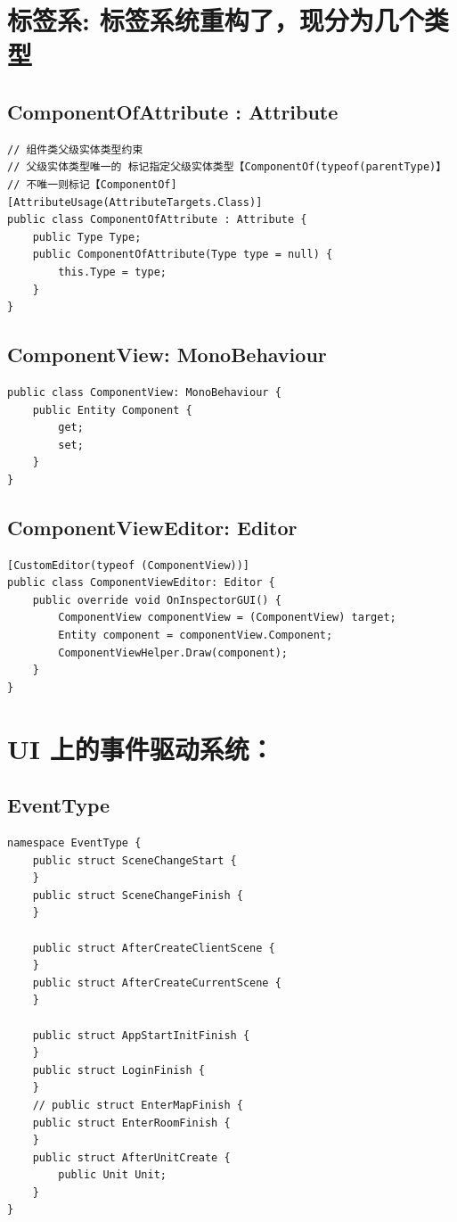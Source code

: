 \documentclass[9pt, b5paper]{article}
\begin{document}
\section{标签系: 标签系统重构了，现分为几个类型}
\label{sec-4}
\subsection{ComponentOfAttribute : Attribute}
\label{sec-4-1}
\begin{verbatim}
// 组件类父级实体类型约束
// 父级实体类型唯一的 标记指定父级实体类型【ComponentOf(typeof(parentType)】
// 不唯一则标记【ComponentOf]
[AttributeUsage(AttributeTargets.Class)]
public class ComponentOfAttribute : Attribute {
    public Type Type;
    public ComponentOfAttribute(Type type = null) {
        this.Type = type;
    }
}
\end{verbatim}
\subsection{ComponentView: MonoBehaviour}
\label{sec-4-2}
\begin{verbatim}
public class ComponentView: MonoBehaviour {
    public Entity Component {
        get;
        set;
    }
}
\end{verbatim}
\subsection{ComponentViewEditor: Editor}
\label{sec-4-3}
\begin{verbatim}
[CustomEditor(typeof (ComponentView))] 
public class ComponentViewEditor: Editor {
    public override void OnInspectorGUI() {
        ComponentView componentView = (ComponentView) target;
        Entity component = componentView.Component;
        ComponentViewHelper.Draw(component);
    }
}
\end{verbatim}

\section{UI 上的事件驱动系统：}
\label{sec-5}
\subsection{EventType}
\label{sec-5-1}
\begin{verbatim}
namespace EventType {
    public struct SceneChangeStart {
    }
    public struct SceneChangeFinish {
    }

    public struct AfterCreateClientScene {
    }
    public struct AfterCreateCurrentScene {
    }

    public struct AppStartInitFinish {
    }
    public struct LoginFinish {
    }
    // public struct EnterMapFinish {
    public struct EnterRoomFinish {
    }
    public struct AfterUnitCreate {
        public Unit Unit;
    }
}
\end{verbatim}
\end{document}
